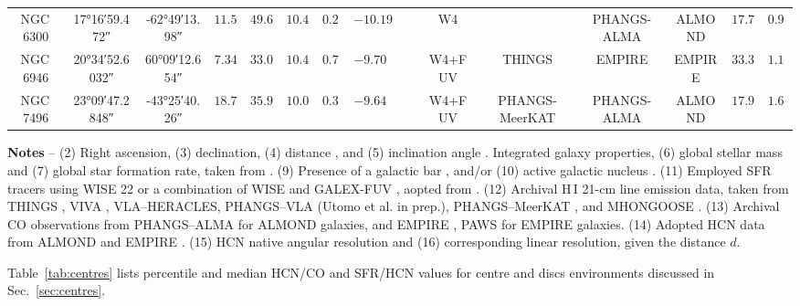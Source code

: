 \documentclass[letter, longauth]{aa} %
\newcommand*{\coone}{\ensuremath{\mathrm{CO(1-0)}}\xspace} %
\newcommand*{\cotwo}{\ensuremath{\mathrm{CO(2-1)}}\xspace} %
\newcommand*{\hone}{\ensuremath{\text{H}\,{\scriptstyle\text{I}}}\xspace}  %
\newcommand*{\ra}[2][]{{
		\ang[
		angle-symbol-degree=\textsuperscript{h},
		angle-symbol-minute=\textsuperscript{m},
		angle-symbol-second=\textsuperscript{s},
		#1]{#2}%
}}
\newcommand{\cmark}{\textcolor{green}{\ding{51}}}
\newcommand{\xmark}{\textcolor{red}{\ding{55}}}
\begin{document}
\begin{appendix}
\begin{table}
\begin{center}
{\begin{tabular}{cccccccccccccccc}
NGC\,6300 & \ra{17;16;59.472} & \ang{-62;49;13.98} & $11.58$ & $49.60$ & $10.47$ & $0.28$ & $-10.19$ & \cmark & \cmark & W4 & \xmark & PHANGS-ALMA & ALMOND & $17.70$ & $0.99$ \\
NGC\,6946 & \ra{20;34;52.6032} & \ang{+60;09;12.654} & $7.34$ & $33.00$ & $10.47$ & $0.77$ & $-9.70$ & \cmark & \xmark & W4+FUV & THINGS & EMPIRE & EMPIRE & $33.30$ & $1.18$ \\
NGC\,7496 & \ra{23;09;47.2848} & \ang{-43;25;40.26} & $18.72$ & $35.90$ & $10.00$ & $0.35$ & $-9.64$ & \cmark & \cmark & W4+FUV & PHANGS-MeerKAT & PHANGS-ALMA & ALMOND & $17.90$ & $1.62$ \\
    \hline\hline
\end{tabular}
}
\end{center}
\footnotesize{
    \textbf{Notes} -- (2) Right ascension, (3) declination, (4) distance \citep{Anand2021}, and (5) inclination angle \citep{Lang2020}.
    Integrated galaxy properties, (6) global stellar mass and (7) global star formation rate, taken from \cite{Leroy2019}.
    (9) Presence of a galactic bar \citep{Herrera-Endoqui2015, Querejeta2021b}, and/or (10) active galactic nucleus \citep{Veron2010}.
    (11) Employed SFR tracers using WISE \SI{22}{\micron} \citep{Wright2010} or a combination of WISE and GALEX-FUV \citep{Martin2005}, aopted from \citep{Leroy2019}.
    (12) Archival \hone 21-cm line emission data, taken from THINGS \citep{Walter2008}, VIVA \citep{Chung2009}, VLA--HERACLES, PHANGS--VLA (Utomo et al. in prep.), PHANGS--MeerKAT \citep[][; Pisano et al. in prep.]{Eibensteiner2024}, and MHONGOOSE \citep{deBlok2024}.
    (13) Archival CO observations from PHANGS--ALMA \citep[\cotwo;][]{Leroy2021b} for ALMOND galaxies, and EMPIRE \citep[\coone;][]{Jimenez-Donaire2019}, PAWS \citep[\coone;][]{Schinnerer2013} for EMPIRE galaxies.
    (14) Adopted HCN data from ALMOND \citep{Neumann2023a} and EMPIRE \citep{Jimenez-Donaire2019}. 
    (15) HCN native angular resolution and (16) corresponding linear resolution, given the distance $d$.
}
\end{table}

Table~\ref{tab:centres} lists percentile and median HCN/CO and SFR/HCN values for centre and discs environments discussed in Sec.~\ref{sec:centres}.


\end{appendix}
\end{document}
